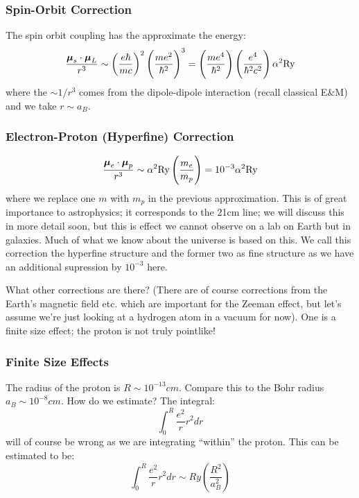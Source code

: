 \subsubsection{Spin-Orbit Correction}
The spin orbit coupling has the approximate the energy:
\begin{equation}
    \frac{\gv{\mu}_s \cdot \gv{\mu}_L}{r^3} \sim \left(\frac{e\hbar}{mc}\right)^2\left(\frac{me^2}{\hbar^2}\right)^3 = \left(\frac{me^4}{\hbar^2}\right)\left(\frac{e^4}{\hbar^2c^2}\right)\alpha^2\si{Ry}
\end{equation}
where the $\sim 1/r^3$ comes from the dipole-dipole interaction (recall classical E\&M) and we take $r \sim a_B$. 

\subsubsection{Electron-Proton (Hyperfine) Correction}
\begin{equation}
    \frac{\gv{\mu}_e \cdot \gv{\mu}_p}{r^3} \sim \alpha^2\si{Ry}\left(\frac{m_e}{m_p}\right) = 10^{-3}\alpha^2\si{Ry}
\end{equation}
where we replace one $m$ with $m_p$ in the previous approximation. This is of great importance to astrophysics; it corresponds to the 21cm line; we will discuss this in more detail soon, but this is effect we cannot observe on a lab on Earth but in galaxies. Much of what we know about the universe is based on this. We call this correction the hyperfine structure and the former two as fine structure as we have an additional supression by $10^{-3}$ here.

What other corrections are there? (There are of course corrections from the Earth's magnetic field etc. which are important for the Zeeman effect, but let's assume we're just looking at a hydrogen atom in a vacuum for now). One is a finite size effect; the proton is not truly pointlike!

\subsubsection{Finite Size Effects}
The radius of the proton is $R \sim 10^{-13}\si{cm}$. Compare this to the Bohr radius $a_B \sim 10^{-8}\si{cm}$. How do we estimate? The integral:
\begin{equation}
    \int_0^R \frac{e^2}{r}r^2 dr
\end{equation}
will of course be wrong as we are integrating ``within'' the proton. This can be estimated to be:
\begin{equation}
    \int_0^R \frac{e^2}{r}r^2 dr \sim \si{Ry}\left(\frac{R^2}{a_B^2}\right)
\end{equation}

